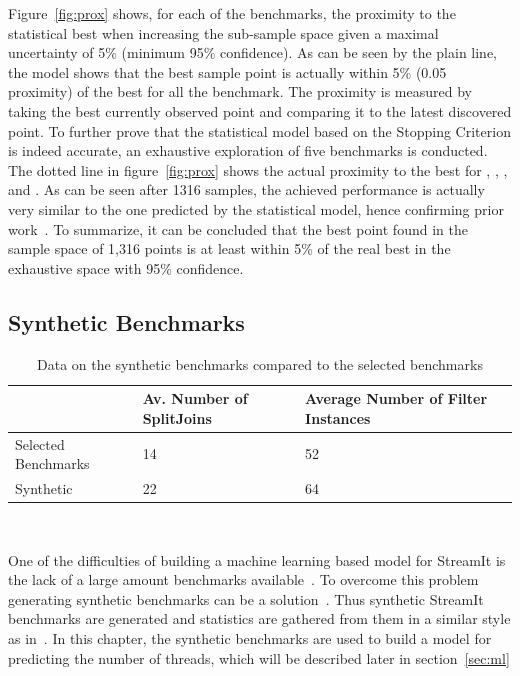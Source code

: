 Figure~\ref{fig:prox} shows, for each of the benchmarks, the proximity to the statistical best when increasing the sub-sample space given a maximal uncertainty of 5\%  (\ie minimum 95\% confidence).
As can be seen by the plain line, the model shows that the best sample point is actually within 5\% (0.05 proximity) of the best for all the benchmark.
The proximity is measured by taking the best currently observed point and comparing it to the latest discovered point.
To further prove that the statistical model based on the Stopping Criterion is indeed accurate, an exhaustive exploration of five benchmarks is conducted.
The dotted line in figure~\ref{fig:prox} shows the actual proximity to the best for , , ,  and .
As can be seen after 1316 samples, the achieved performance is actually very similar to the one predicted by the statistical model, hence confirming prior work~\cite{vuduc2003AutomaticPerf}.
To summarize, it can be concluded that the best point found in the sample space of 1,316 points is at least within 5\% of the real best in the exhaustive space with 95\% confidence.

\subsection{Synthetic Benchmarks}

\begin{table}[t]
  \small
 \begin{tabular} { | l | l | l | }
 \hline
 & Av. Number of SplitJoins & Average Number of Filter Instances \\ \hline
 Selected Benchmarks & 14 & 52 \\ \hline 
 Synthetic & 22 & 64 \\ \hline
 \end{tabular}
 \caption{Data on the synthetic benchmarks compared to the selected benchmarks}~\label{tab:synthvsreal}
 \end{table}

One of the difficulties of building a machine learning based model for StreamIt is the lack of a large amount benchmarks available~\cite{wang2013partitionstreamit}.
To overcome this problem generating synthetic benchmarks can be a solution~\cite{cumminsopencl2017}.
Thus synthetic StreamIt benchmarks are generated and statistics are gathered from them in a similar style as in~\cite{wang2013partitionstreamit}.
In this chapter, the synthetic benchmarks are used to build a model for predicting the number of threads, which will be described later in section~\ref{sec:ml}

